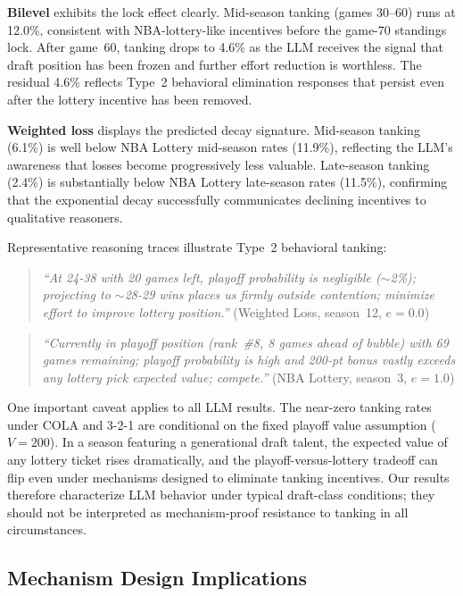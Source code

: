 \documentclass{article}
\begin{document}
\textbf{Bilevel} exhibits the lock effect clearly.
Mid-season tanking (games 30--60) runs at 12.0\%, consistent with
NBA-lottery-like incentives before the game-70 standings lock.
After game~60, tanking drops to 4.6\% as the LLM receives the signal that
draft position has been frozen and further effort reduction is worthless.
The residual 4.6\% reflects Type~2 behavioral elimination responses that
persist even after the lottery incentive has been removed.

\textbf{Weighted loss} displays the predicted decay signature.
Mid-season tanking (6.1\%) is well below NBA Lottery mid-season rates (11.9\%),
reflecting the LLM's awareness that losses become progressively less valuable.
Late-season tanking (2.4\%) is substantially below NBA Lottery late-season
rates (11.5\%), confirming that the exponential decay successfully communicates
declining incentives to qualitative reasoners.

Representative reasoning traces illustrate Type~2 behavioral tanking:

\begin{quote}
\textit{``At 24-38 with 20 games left, playoff probability is negligible
(${\sim}$2\%); projecting to ${\sim}$28-29 wins places us firmly outside
contention; minimize effort to improve lottery position.''}
(Weighted Loss, season~12, $e = 0.0$)
\end{quote}

\begin{quote}
\textit{``Currently in playoff position (rank~\#8, 8 games ahead of bubble)
with 69 games remaining; playoff probability is high and 200-pt bonus
vastly exceeds any lottery pick expected value; compete.''}
(NBA Lottery, season~3, $e = 1.0$)
\end{quote}

One important caveat applies to all LLM results.
The near-zero tanking rates under COLA and 3-2-1 are conditional on the
fixed playoff value assumption ($V = 200$).
In a season featuring a generational draft talent, the expected value of
any lottery ticket rises dramatically, and the playoff-versus-lottery
tradeoff can flip even under mechanisms designed to eliminate tanking
incentives.
Our results therefore characterize LLM behavior under typical draft-class
conditions; they should not be interpreted as mechanism-proof resistance
to tanking in all circumstances.

\subsection{Mechanism Design Implications}
\end{document}
